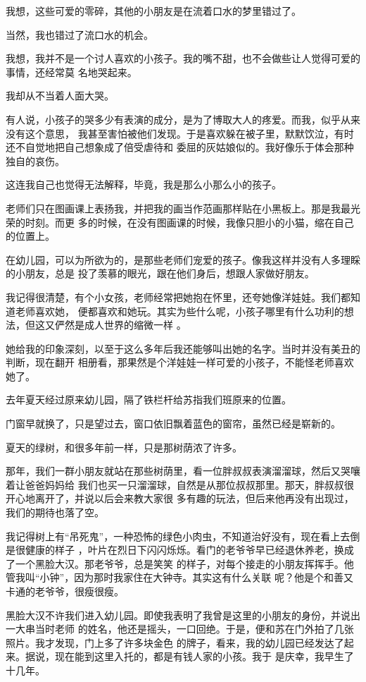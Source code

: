 \documentclass[12pt,a4paper]{article}
\begin{document}
		我想，这些可爱的零碎，其他的小朋友是在流着口水的梦里错过了。

		当然，我也错过了流口水的机会。

		我想，我并不是一个讨人喜欢的小孩子。我的嘴不甜，也不会做些让人觉得可爱的事情，还经常莫
	名地哭起来。

		我却从不当着人面大哭。

		有人说，小孩子的哭多少有表演的成分，是为了博取大人的疼爱。而我，似乎从来没有这个意思，
	我甚至害怕被他们发现。于是喜欢躲在被子里，默默饮泣，有时还不自觉地把自己想象成了倍受虐待和
	委屈的灰姑娘似的。我好像乐于体会那种独自的哀伤。

		这连我自己也觉得无法解释，毕竟，我是那么小那么小的孩子。

		老师们只在图画课上表扬我，并把我的画当作范画那样贴在小黑板上。那是我最光荣的时刻。而更
	多的时候，在没有图画课的时候，我像只胆小的小猫，缩在自己的位置上。

		在幼儿园，可以为所欲为的，是那些老师们宠爱的孩子。像我这样并没有人多理睬的小朋友，总是
	投了羡慕的眼光，跟在他们身后，想跟人家做好朋友。

		我记得很清楚，有个小女孩，老师经常把她抱在怀里，还夸她像洋娃娃。我们都知道老师喜欢她，
	便都喜欢和她玩。其实为些什么呢，小孩子哪里有什么功利的想法，但这又俨然是成人世界的缩微一样
	。

		她给我的印象深刻，以至于这么多年后我还能够叫出她的名字。当时并没有美丑的判断，现在翻开
	相册看，那果然是个洋娃娃一样可爱的小孩子，不能怪老师喜欢她了。

		去年夏天经过原来幼儿园，隔了铁栏杆给苏指我们班原来的位置。

		门窗早就换了，只是望过去，窗口依旧飘着蓝色的窗帘，虽然已经是崭新的。

		夏天的绿树，和很多年前一样，只是那树荫浓了许多。

		那年，我们一群小朋友就站在那些树荫里，看一位胖叔叔表演溜溜球，然后又哭嚷着让爸爸妈妈给
	我们也买一只溜溜球，自然是从那位叔叔那里。那天，胖叔叔很开心地离开了，并说以后会来教大家很
	多有趣的玩法，但后来他再没有出现过，我们的期待也落了空。

		我记得树上有“吊死鬼”，一种恐怖的绿色小肉虫，不知道治好没有，现在看上去倒是很健康的样子
	，叶片在烈日下闪闪烁烁。看门的老爷爷早已经退休养老，换成了一个黑脸大汉。那老爷爷，总是笑笑
	的样子，对每个接走的小朋友挥挥手。他管我叫“小钟”，因为那时我家住在大钟寺。其实这有什么关联
	呢？他是个和善又卡通的老爷爷，很瘦很瘦。

		黑脸大汉不许我们进入幼儿园。即使我表明了我曾是这里的小朋友的身份，并说出一大串当时老师
	的姓名，他还是摇头，一口回绝。于是，便和苏在门外拍了几张照片。我才发现，门上多了许多块金色
	的牌子，看来，我的幼儿园已经发达了起来。据说，现在能到这里入托的，都是有钱人家的小孩。我于
	是庆幸，我早生了十几年。
\end{document}

